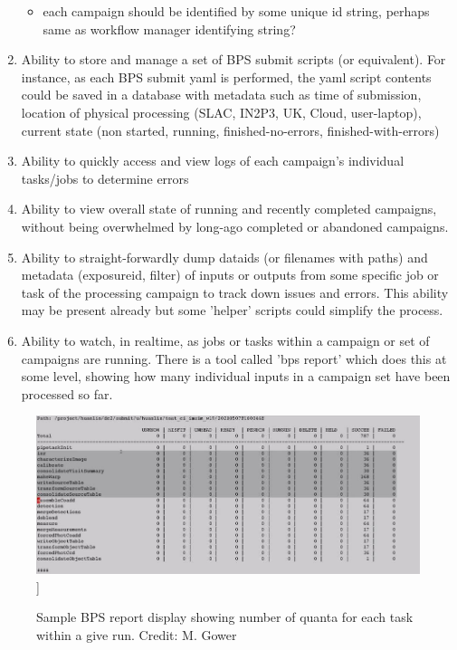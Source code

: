 \documentclass[DM,authoryear,toc]{lsstdoc}
\begin{document}
\begin{enumerate}
\begin{itemize}
	\item each campaign should be identified by some unique id string, 
	perhaps same as workflow manager identifying string?

	\end{itemize}

	\item Ability to store and manage a set of BPS submit scripts 
	(or equivalent).
	For instance, as each BPS submit yaml is performed, the yaml
	script contents could be saved in a database with metadata such
	as time of submission, location of physical processing
	(SLAC, IN2P3, UK, Cloud, user-laptop), current state (non started,
	running, finished-no-errors, finished-with-errors)


	\item Ability to quickly access and view logs of each 
	campaign's individual tasks/jobs to determine errors

	\item Ability to view overall state of running and recently
	completed campaigns, without being overwhelmed by long-ago completed
	or abandoned campaigns.

	\item Ability to straight-forwardly dump dataids (or filenames
	with paths) and metadata (exposureid, filter) of inputs or outputs
	from some specific job or task of the processing campaign to
	track down issues and errors.  This ability may be present already
	but some 'helper' scripts could simplify the process.

	\item Ability to watch, in realtime, as jobs or tasks within
	a campaign or set of campaigns are running.  There is a tool	
	called 'bps report' which does this at some level, showing how
	many individual inputs in a campaign set have been processed
	so far.

	\end {enumerate}

\begin{figure}
\includegraphics[width=\textwidth]{bpsreport.jpg}]
\caption{Sample BPS report display showing number of quanta for each task within a give run.
Credit: M. Gower}
\end{figure}
\end{document}
